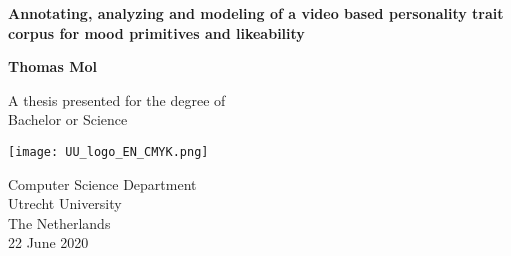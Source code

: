\begin{titlepage}
   \begin{center}
       \vspace*{1cm}
        \Huge
        \textbf{Annotating, analyzing and modeling of a video based personality trait corpus for mood primitives and likeability}

        \vspace{1.5cm}

       \textbf{Thomas Mol}

       \vfill
       \normalsize     
       A thesis presented for the degree of\\
       Bachelor or Science
            
       \vspace{0.8cm}
     
       \texttt{[image: UU\_logo\_EN\_CMYK.png]}
            
       Computer Science Department\\
       Utrecht University\\
       The Netherlands\\
       22 June 2020
            
   \end{center}
\end{titlepage}